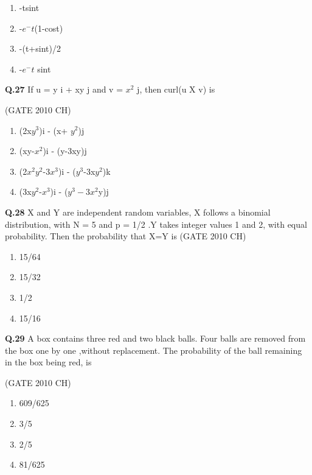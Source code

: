\documentclass[journal,12pt,onecolumn]{exam}
\theoremstyle{remark}
\begin{document}
\begin{enumerate}
    \item -tsint
    \item -$e^-t$(1-cost)\\
    \item -(t+sint)/2
    \item -$e^-t$ sint
\end{enumerate}


\noindent
\textbf{Q.27}
 If u = y i + xy j and v = $x^2$ j, then curl(u X v) is

 \hfill{(GATE 2010 CH)}\\
 
 \begin{enumerate}
     \item (2x$y^3$)i - (x+ $y^2$)j
     \item (xy-$x^2$)i - (y-3xy)j
     \item (2$x^2y^2$-3$x^3$)i - ($y^3$-3x$y^2$)k
     \item (3x$y^2$-$x^3$)i - ($y^3-3x^2$y)j
 \end{enumerate}

\noindent
\textbf{Q.28}
 X and Y are independent random variables, X follows a binomial distribution, with N = 5 and p = 1/2 .Y takes integer values 1 and 2, with equal probability. Then the probability that X=Y is
 \hfill{(GATE 2010 CH)}\\

 \begin{enumerate}
     \item 15/64
     \item 15/32
     \item 1/2
     \item 15/16
     
 \end{enumerate}

 \noindent
 \textbf{Q.29}
  A box contains three red and two black balls. Four balls are removed from the box one by one ,without replacement. The probability of the ball remaining in the box being red, is

  \hfill{(GATE 2010 CH)}\\

  \begin{enumerate}
      \item 609/625
      \item 3/5
      \item 2/5
      \item 81/625
  \end{enumerate}
 
\end{document}
